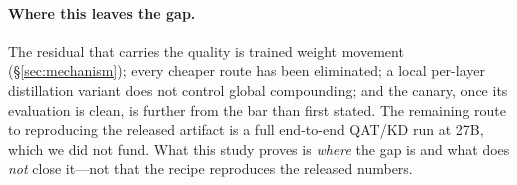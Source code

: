 \paragraph{Where this leaves the gap.}
The residual that carries the quality is trained weight movement
(\S\ref{sec:mechanism}); every cheaper route has been eliminated; a local
per-layer distillation variant does not control global compounding; and the
canary, once its evaluation is clean, is further from the bar than first
stated. The remaining route to reproducing the released artifact is a full
end-to-end QAT/KD run at 27B, which we did not fund. What this study proves is
\emph{where} the gap is and what does \emph{not} close it---not that the recipe
reproduces the released numbers.
